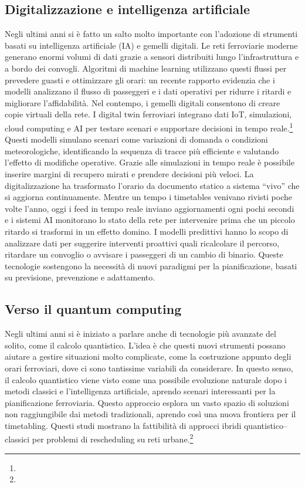 \documentclass{report}
\newcommand{\fnShort}[2][]{\footnote{\footshorthand[#1]{#2}}}
\begin{document}
\subsection{Digitalizzazione e intelligenza artificiale}
Negli ultimi anni si è fatto un salto molto importante con l’adozione di strumenti basati su intelligenza artificiale (IA) e gemelli digitali. Le reti ferroviarie moderne generano enormi volumi di dati grazie a sensori distribuiti lungo l’infrastruttura e a bordo dei convogli. Algoritmi di machine learning utilizzano questi flussi per prevedere guasti e ottimizzare gli orari: un recente rapporto evidenzia che i modelli analizzano il flusso di passeggeri e i dati operativi per ridurre i ritardi e migliorare l’affidabilità.
Nel contempo, i gemelli digitali consentono di creare copie virtuali della rete. I digital twin ferroviari integrano dati IoT, simulazioni, cloud computing e AI per testare scenari e supportare decisioni in tempo reale.\fnShort{DT2025}
 Questi modelli simulano scenari come variazioni di domanda o condizioni meteorologiche, identificando la sequenza di tracce più efficiente e valutando l’effetto di modifiche operative.
Grazie alle simulazioni in tempo reale è possibile inserire margini di recupero mirati e prendere decisioni più veloci.
La digitalizzazione ha trasformato l’orario da documento statico a sistema “vivo” che si aggiorna continuamente. Mentre un tempo i timetables venivano rivisti poche volte l’anno, oggi i feed in tempo reale inviano aggiornamenti ogni pochi secondi e i sistemi AI monitorano lo stato della rete per intervenire prima che un piccolo ritardo si trasformi in un effetto domino.
I modelli predittivi hanno lo scopo di analizzare dati per suggerire interventi proattivi quali ricalcolare il percorso, ritardare un convoglio o avvisare i passeggeri di un cambio di binario.
Queste tecnologie sostengono la necessità di nuovi paradigmi per la pianificazione, basati su previsione, prevenzione e adattamento.



\subsection{Verso il quantum computing}
Negli ultimi anni si è iniziato a parlare anche di tecnologie più avanzate del solito, come il calcolo quantistico. L’idea è che questi nuovi strumenti possano aiutare a gestire situazioni molto complicate, come la costruzione appunto degli orari ferroviari, dove ci sono tantissime variabili da considerare. In questo senso, il calcolo quantistico viene visto come una possibile evoluzione naturale dopo i metodi classici e l’intelligenza artificiale, aprendo scenari interessanti per la pianificazione ferroviaria.
Questo approccio esplora un vasto spazio di soluzioni non raggiungibile dai metodi tradizionali, aprendo così una nuova frontiera per il timetabling.
Questi studi mostrano la fattibilità di approcci ibridi quantistico–classici per problemi di rescheduling su reti urbane.\fnShort{QRail2024}
\end{document}
